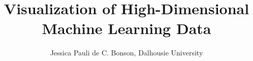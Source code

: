 \documentclass[journal]{IEEEtran}
\begin{document}
%
\title{Visualization of High-Dimensional Machine Learning Data}
%
%
%

\author{Jessica Pauli de C. Bonson, Dalhousie University}

% 
%










\maketitle
\end{document}
